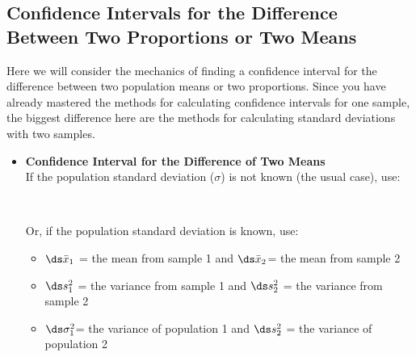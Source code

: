\subsection{Confidence Intervals for the Difference Between Two Proportions or Two Means}
\label{Section: CI 2 proportions} 




Here we will consider the mechanics of finding a confidence interval for the difference between two population means or two proportions. Since you have already mastered the methods for calculating confidence intervals for one sample, the biggest difference here are the methods for calculating standard deviations with two samples. 

\begin{itemize}
\item {\bf Confidence Interval for the Difference of Two Means}\\
If the population standard deviation ($\sigma$) is not known (the usual case), use:
\hspace{.1in}
\begin{center}
\vspace{.1in}
\\
\end{center}
\vspace{.1in}
Or, if the population standard deviation is known, use:
\begin{center}
\vspace{.1in}
\end{center}
\begin{itemize}
\item $\ds \bar{x}_1$ = the mean from sample 1 and $\ds \bar{x} _2$= the mean from sample 2
\item $\ds s_1^2$ = the variance from sample 1 and $\ds s_2^2$ = the variance from sample 2
\item $\ds \sigma_1^2$= the variance of population 1 and $\ds s_2^2$ = the variance of population 2

\end{itemize}
\end{itemize}
